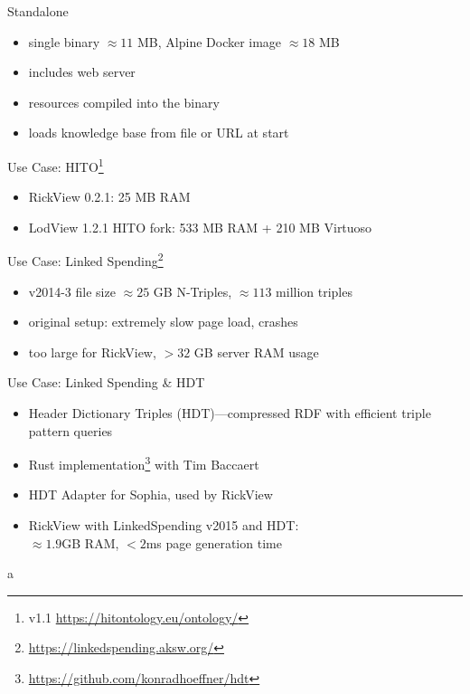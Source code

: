 \documentclass[14pt,aspectratio=1610]{beamer}
\begin{document}
\begin{frame}{Standalone}
\begin{itemize}
\item single binary $\approx 11$ MB, Alpine Docker image $\approx 18$ MB
\item includes web server
\item resources compiled into the binary
\item loads knowledge base from file or URL at start
\end{itemize}
\end{frame}

\begin{frame}{Use Case: HITO\footnote{v1.1 \url{https://hitontology.eu/ontology/}}}
\begin{itemize}
\item RickView 0.2.1: 25 MB RAM
\item LodView 1.2.1 HITO fork: 533 MB RAM + 210 MB Virtuoso
\end{itemize}
\end{frame}

\begin{frame}{Use Case: Linked Spending\footnote{\url{https://linkedspending.aksw.org/}}}
\begin{itemize}
\item v2014-3 file size $\approx 25$ GB N-Triples, $\approx 113$ million triples
\item original setup: extremely slow page load, crashes
\item too large for RickView, $> 32$ GB server RAM usage
\end{itemize}
\end{frame}

\begin{frame}{Use Case: Linked Spending \& HDT}
\begin{itemize}
\item Header Dictionary Triples (HDT)---compressed RDF with efficient triple pattern queries
\item Rust implementation\footnote{\url{https://github.com/konradhoeffner/hdt}} with Tim Baccaert
\item HDT Adapter for Sophia, used by RickView
\item RickView with LinkedSpending v2015 and HDT:\\$\approx 1.9$GB RAM,  $<2$ms page generation time
\end{itemize}
\end{frame}

\begin{frame}{}
\end{frame}

\begin{frame}{}
\end{frame}
a
\end{document}
